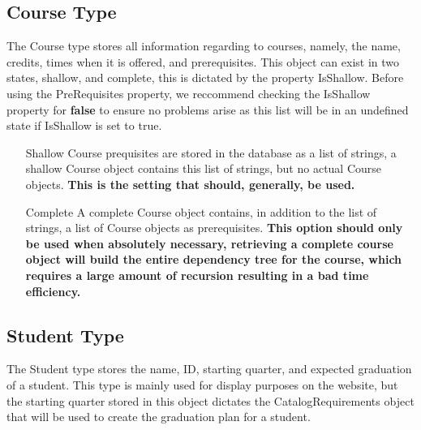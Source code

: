\documentclass[letterpaper]{report}
\begin{document}
	\subsection{Course Type}
	The Course type stores all information regarding to courses, namely, the name, credits, times when it is offered, and prerequisites. This object can exist in two states, shallow, and complete, this is dictated by the property IsShallow. Before using the PreRequisites property, we reccommend checking the IsShallow property for \textbf{false} to ensure no problems arise as this list will be in an undefined state if IsShallow is set to true.
	\begin{enumerate}
		\item [Shallow] Course prequisites are stored in the database as a list of strings, a shallow Course object contains this list of strings, but no actual Course objects. \textbf{This is the setting that should, generally, be used.}
		\item [Complete] A complete Course object contains, in addition to the list of strings, a list of Course objects as prerequisites. \textbf{This option should only be used when absolutely necessary, retrieving a complete course object will build the entire dependency tree for the course, which requires a large amount of recursion resulting in a bad time efficiency.}
	\end{enumerate}
	\subsection{Student Type}
	The Student type stores the name, ID, starting quarter, and expected graduation of a student. This type is mainly used for display purposes on the website, but the starting quarter stored in this object dictates the CatalogRequirements object that will be used to create the graduation plan for a student.
	
\end{document}
